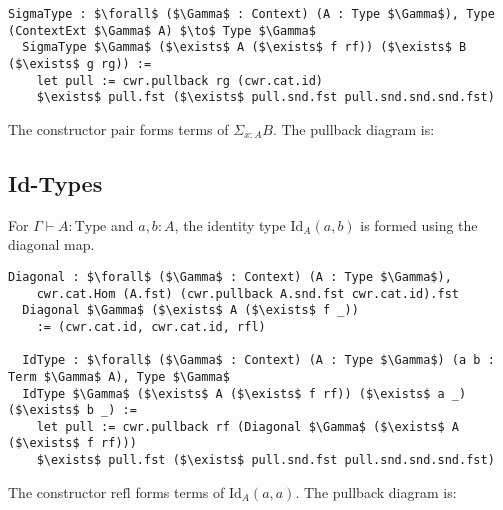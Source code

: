 \documentclass{article}
\theoremstyle{definition}
\begin{document}
\begin{lstlisting}[mathescape=true]
  SigmaType : $\forall$ ($\Gamma$ : Context) (A : Type $\Gamma$), Type (ContextExt $\Gamma$ A) $\to$ Type $\Gamma$
  SigmaType $\Gamma$ ($\exists$ A ($\exists$ f rf)) ($\exists$ B ($\exists$ g rg)) :=
    let pull := cwr.pullback rg (cwr.cat.id)
    $\exists$ pull.fst ($\exists$ pull.snd.fst pull.snd.snd.snd.fst)
\end{lstlisting}

The constructor $\text{pair}$ forms terms of $\Sigma_{x : A} B$. The pullback diagram is:


\newpage
\subsection{Id-Types}
For $\Gamma \vdash A : \text{Type}$ and $a, b : A$, the identity type $\text{Id}_A(a, b)$ is formed using the diagonal map.

\begin{lstlisting}[mathescape=true]
  Diagonal : $\forall$ ($\Gamma$ : Context) (A : Type $\Gamma$),
    cwr.cat.Hom (A.fst) (cwr.pullback A.snd.fst cwr.cat.id).fst
  Diagonal $\Gamma$ ($\exists$ A ($\exists$ f _))
    := (cwr.cat.id, cwr.cat.id, rfl)

  IdType : $\forall$ ($\Gamma$ : Context) (A : Type $\Gamma$) (a b : Term $\Gamma$ A), Type $\Gamma$
  IdType $\Gamma$ ($\exists$ A ($\exists$ f rf)) ($\exists$ a _) ($\exists$ b _) :=
    let pull := cwr.pullback rf (Diagonal $\Gamma$ ($\exists$ A ($\exists$ f rf)))
    $\exists$ pull.fst ($\exists$ pull.snd.fst pull.snd.snd.snd.fst)
\end{lstlisting}

The constructor $\text{refl}$ forms terms of $\text{Id}_A(a, a)$. The pullback diagram is:

\end{document}
